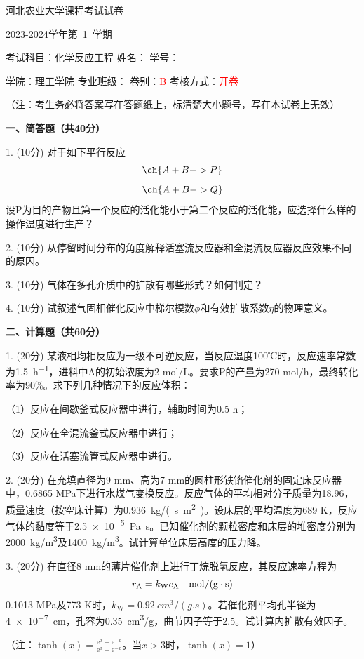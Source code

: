 \documentclass[12pt, b5paper]{article}
\newcommand*{\cred}{\textcolor{red}}
\begin{document}
\begin{spacing}{1.625}

\centerline{{\huge 河北农业大学课程考试试卷}}

\centerline{\large 2023-2024学年第\underline{\ 1\ }学期}

考试科目：\underline{化学反应工程} \hfill 姓名：\underline{ \qquad \qquad} \hfill 学号：\underline{ \qquad \qquad \qquad \qquad}

学院：\underline{理工学院} \hfill 专业班级：\underline{\qquad \qquad \qquad \qquad} \hfill 卷别：\cred{B} \hfill 考核方式：\cred{开卷}

（注：考生务必将答案写在答题纸上，标清楚大小题号，写在本试卷上无效）

\bigskip

{\bfseries 一、简答题（共40分）}

1. (10分) 对于如下平行反应
\[
	\ch{A + B -> P}
\]
\[
	\ch{A + B -> Q}
\]
设P为目的产物且第一个反应的活化能小于第二个反应的活化能，应选择什么样的操作温度进行生产？

\bigskip
\bigskip

2. (10分) 从停留时间分布的角度解释活塞流反应器和全混流反应器反应效果不同的原因。

\bigskip
\bigskip

3. (10分) 气体在多孔介质中的扩散有哪些形式？如何判定？

\bigskip
\bigskip

4. (10分) 试叙述气固相催化反应中梯尔模数$\phi$和有效扩散系数$\eta$的物理意义。

\newpage
{\bfseries 二、计算题（共60分）}

1. (20分) 某液相均相反应为一级不可逆反应，当反应温度100℃时，反应速率常数为\SI{1.5}{h^{-1}}，进料中A的初始浓度为2 mol/L。要求P的产量为270 mol/h，最终转化率为90\%。求下列几种情况下的反应体积：

（1）反应在间歇釜式反应器中进行，辅助时间为0.5 h；

（2）反应在全混流釜式反应器中进行；

（3）反应在活塞流管式反应器中进行。

\bigskip
\bigskip

2. (20分) 在充填直径为9 mm、高为7 mm的圆柱形铁铬催化剂的固定床反应器中，0.6865 MPa下进行水煤气变换反应。反应气体的平均相对分子质量为18.96，质量速度（按空床计算）为\SI{0.936}{kg/(s.m^2)}。设床层的平均温度为689 K，反应气体的黏度等于\SI{2.5e-5}{Pa.s}。已知催化剂的颗粒密度和床层的堆密度分别为\SI{2000}{kg/m^3}及\SI{1400}{kg/m^3}。试计算单位床层高度的压力降。

\bigskip
\bigskip

3. (20分) 在直径8 mm的薄片催化剂上进行丁烷脱氢反应，其反应速率方程为
\vspace{-1.5em}
\[
	r_{\mathrm{A}} =k_{\mathrm{W}} c_{\mathrm{A}} \quad \mathrm{mol} /(\mathrm{g} \cdot \mathrm{s})
	\vspace{-1.5em}
\]
0.1013 MPa及773 K时，$k_\mathrm{W} = \SI{0.92}{cm^3/(g.s)}$。若催化剂平均孔半径为\SI{4e-7}{cm}，孔容为\SI{0.35}{cm^3/g}，曲节因子等于2.5。试计算内扩散有效因子。

（注：$\tanh (x) = \frac{\mathrm{e}^x - \mathrm{e}^{-x}}{\mathrm{e}^x + \mathrm{e}^{-x}}$。当$x>3$时，$\tanh (x) = 1$）


\end{spacing}
\end{document}
